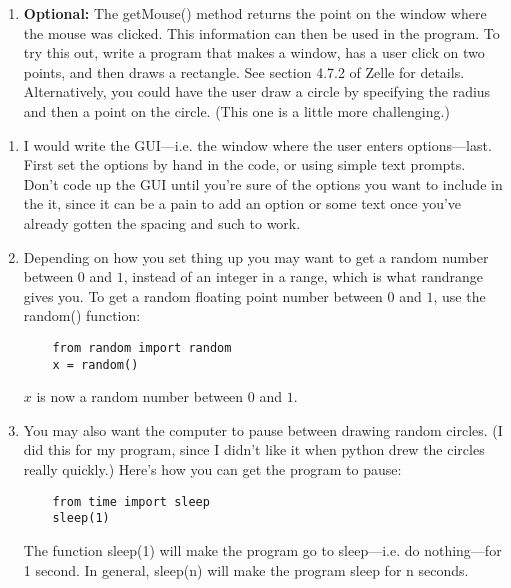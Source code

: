 \documentclass[12pt]{article}
\begin{document}
\begin{enumerate}
\item {\bf Optional:}  The getMouse() method returns the point on the
  window where the mouse was clicked.  This information can then be
  used in the program.  To try this out, write a program that makes a
  window, has a user click on two points, and then draws a rectangle.
  See section 4.7.2 of Zelle for details.  Alternatively, you could
  have the user draw a circle by specifying the radius and then a
  point on the circle.  (This one is a little more challenging.) 


\end{enumerate}


\begin{enumerate}

  \item I would write the GUI---i.e. the window where the user enters
    options---last.  First set the options by hand in the code, or
    using simple text prompts.  Don't code up the GUI until you're
    sure of the options you want to include in the it, since it can be
    a pain to add an option or some text once you've already gotten
    the spacing and such to work.

  \item Depending on how you set thing up you may want to get a random
    number between $0$ and $1$, instead of an integer in a range,
    which is what randrange gives you.  To get a random floating point
    number between $0$ and $1$, use the random() function:
\begin{verbatim}
    from random import random
    x = random()
\end{verbatim}
$x$ is now a random number between $0$ and $1$. 

  \item You may also want the computer to pause between drawing random
    circles.  (I did this for my program, since I didn't like it when
    python drew the circles really quickly.)  Here's how you can get
    the program to pause:
\begin{verbatim}
    from time import sleep
    sleep(1)
\end{verbatim}
The function sleep(1) will make the program go to sleep---i.e. do
nothing---for 1 second.  In general, sleep(n) will make the program
sleep for n seconds.  

\end{enumerate}
\end{document}
